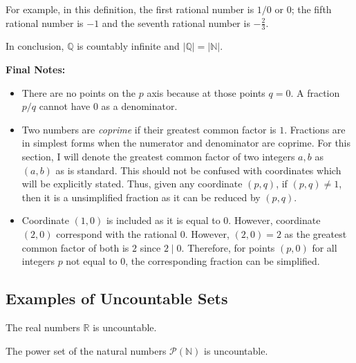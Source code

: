 \begin{figure}[H]
{
    }
\end{figure}

For example, in this definition, the first rational number is \(1/0\) or \(0\); the fifth rational number
is \(-1\) and the seventh rational number is \(-\frac{2}{3}\).

In conclusion, \(\mathbb{Q}\) is countably infinite and \(|\mathbb{Q}|=|\mathbb{N}|\).

\bigskip
\textbf{Final Notes:}
\begin{itemize}
    \item There are no points on the \(p\) axis because at those points \(q=0\). A fraction \(p/q\) cannot have
    \(0\) as a denominator.
    \item Two numbers are \emph{coprime} if their greatest common factor is \(1\). Fractions are in simplest
    forms when the numerator and denominator are coprime. For this section, I will denote the greatest common
    factor of two integers \(a,b\) as \((a,b)\) as is standard. This should not be confused with coordinates which 
    will be explicitly stated. Thus, given any coordinate \((p,q)\), if \((p,q)\ne1\), then it is a unsimplified fraction
    as it can be reduced by \((p,q)\).
    \item Coordinate \((1,0)\) is included as it is equal to \(0\). However, coordinate \((2,0)\) correspond with
    the rational \(0\). However, \((2,0)=2\) as the greatest common factor of both is \(2\) since \(2\mid 0\).
    Therefore, for points \((p,0)\) for all integers \(p\) not equal to \(0\), the corresponding fraction can be simplified.
\end{itemize}

\subsection{Examples of Uncountable Sets}

\begin{proposition}
    The real numbers \(\mathbb{R}\) is uncountable.
\end{proposition}

\bigskip
\begin{proposition}
    The power set of the natural numbers \(\mathcal{P}(\mathbb{N})\) is uncountable.
\end{proposition}